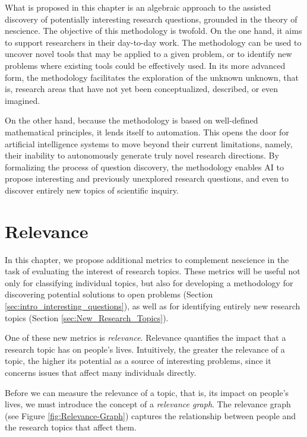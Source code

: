 What is proposed in this chapter is an algebraic approach to the assisted discovery of potentially interesting research questions, grounded in the theory of nescience. The objective of this methodology is twofold. On the one hand, it aims to support researchers in their day-to-day work. The methodology can be used to uncover novel tools that may be applied to a given problem, or to identify new problems where existing tools could be effectively used. In its more advanced form, the methodology facilitates the exploration of the unknown unknown, that is, research areas that have not yet been conceptualized, described, or even imagined.

On the other hand, because the methodology is based on well-defined mathematical principles, it lends itself to automation. This opens the door for artificial intelligence systems to move beyond their current limitations, namely, their inability to autonomously generate truly novel research directions. By formalizing the process of question discovery, the methodology enables AI to propose interesting and previously unexplored research questions, and even to discover entirely new topics of scientific inquiry.

%
%

\section{Relevance}
\label{sec:relevance}

In this chapter, we propose additional metrics to complement nescience in the task of evaluating the interest of research topics. These metrics will be useful not only for classifying individual topics, but also for developing a methodology for discovering potential solutions to open problems (Section \ref{sec:intro_interesting_questions}), as well as for identifying entirely new research topics (Section \ref{sec:New_Research_Topics}).

One of these new metrics is \emph{relevance}. Relevance quantifies the impact that a research topic has on people's lives. Intuitively, the greater the relevance of a topic, the higher its potential as a source of interesting problems, since it concerns issues that affect many individuals directly.

Before we can measure the relevance of a topic, that is, its impact on people's lives, we must introduce the concept of a \emph{relevance graph}. The relevance graph (see Figure \ref{fig:Relevance-Graph}) captures the relationship between people and the research topics that affect them.

